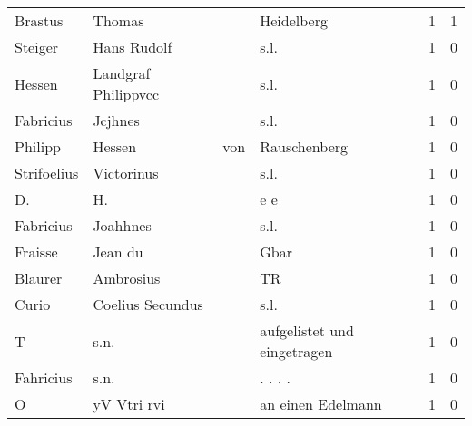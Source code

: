\begin{tabular}{llllrr}
                  Brastus &                             Thomas &             &                                  Heidelberg &          1 &         1 \\
                  Steiger &                        Hans Rudolf &             &                                        s.l. &          1 &         0 \\
                   Hessen &                Landgraf Philippvcc &             &                                        s.l. &          1 &         0 \\
                Fabricius &                            Jcjhnes &             &                                        s.l. &          1 &         0 \\
                  Philipp &                             Hessen &         von &                                Rauschenberg &          1 &         0 \\
              Strifoelius &                         Victorinus &             &                                        s.l. &          1 &         0 \\
                       D. &                                 H. &             &                                         e e &          1 &         0 \\
                Fabricius &                           Joahhnes &             &                                        s.l. &          1 &         0 \\
                  Fraisse &                            Jean du &             &                                        Gbar &          1 &         0 \\
                  Blaurer &                          Ambrosius &             &                                          TR &          1 &         0 \\
                    Curio &                   Coelius Secundus &             &                                        s.l. &          1 &         0 \\
                        T &                               s.n. &             &                 aufgelistet und eingetragen &          1 &         0 \\
                Fahricius &                               s.n. &             &                                    . . . .  &          1 &         0 \\
                        O &                        yV Vtri rvi &             &                           an einen Edelmann &          1 &         0 \\

\end{tabular}
